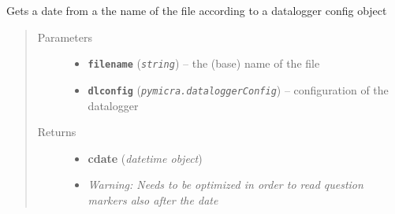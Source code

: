 \documentclass[a4paper,10pt,oneside]{sphinxmanual}
\begin{document}

\begin{fulllineitems}
\label{pymicra.algs:pymicra.algs.general.mad}
\end{fulllineitems}


\begin{fulllineitems}
\label{pymicra.algs:pymicra.algs.general.name2date}
Gets a date from a the name of the file according to a datalogger config object
\begin{quote}\begin{description}
\item[{Parameters}] \leavevmode\begin{itemize}
\item {} 
\textbf{\texttt{filename}} (\emph{\texttt{string}}) -- the (base) name of the file

\item {} 
\textbf{\texttt{dlconfig}} (\emph{\texttt{pymicra.dataloggerConfig}}) -- configuration of the datalogger

\end{itemize}

\item[{Returns}] \leavevmode
\begin{itemize}
\item {} 
\textbf{cdate} (\emph{datetime object})

\item {} 
\emph{Warning: Needs to be optimized in order to read question markers also after the date}

\end{itemize}


\end{description}\end{quote}

\end{fulllineitems}

\end{document}
